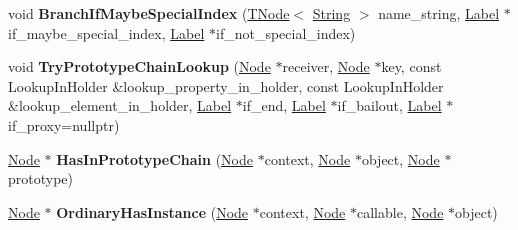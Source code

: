 \begin{DoxyCompactItemize}
\item 
\mbox{\label{classv8_1_1internal_1_1CodeStubAssembler_a328bb177a9eca968f3b887dee232cfe5}} 
void {\bfseries Branch\+If\+Maybe\+Special\+Index} (\mbox{\hyperlink{classv8_1_1internal_1_1compiler_1_1TNode}{T\+Node}}$<$ \mbox{\hyperlink{classv8_1_1internal_1_1String}{String}} $>$ name\+\_\+string, \mbox{\hyperlink{classv8_1_1internal_1_1compiler_1_1CodeAssemblerLabel}{Label}} $\ast$if\+\_\+maybe\+\_\+special\+\_\+index, \mbox{\hyperlink{classv8_1_1internal_1_1compiler_1_1CodeAssemblerLabel}{Label}} $\ast$if\+\_\+not\+\_\+special\+\_\+index)
\item 
\mbox{\label{classv8_1_1internal_1_1CodeStubAssembler_a7bb000cc0f43e802a9ef4f8100a98ce9}} 
void {\bfseries Try\+Prototype\+Chain\+Lookup} (\mbox{\hyperlink{classv8_1_1internal_1_1compiler_1_1Node}{Node}} $\ast$receiver, \mbox{\hyperlink{classv8_1_1internal_1_1compiler_1_1Node}{Node}} $\ast$key, const Lookup\+In\+Holder \&lookup\+\_\+property\+\_\+in\+\_\+holder, const Lookup\+In\+Holder \&lookup\+\_\+element\+\_\+in\+\_\+holder, \mbox{\hyperlink{classv8_1_1internal_1_1compiler_1_1CodeAssemblerLabel}{Label}} $\ast$if\+\_\+end, \mbox{\hyperlink{classv8_1_1internal_1_1compiler_1_1CodeAssemblerLabel}{Label}} $\ast$if\+\_\+bailout, \mbox{\hyperlink{classv8_1_1internal_1_1compiler_1_1CodeAssemblerLabel}{Label}} $\ast$if\+\_\+proxy=nullptr)
\item 
\mbox{\label{classv8_1_1internal_1_1CodeStubAssembler_a65e9a5ba14621ec8f6ea099d0ea497f4}} 
\mbox{\hyperlink{classv8_1_1internal_1_1compiler_1_1Node}{Node}} $\ast$ {\bfseries Has\+In\+Prototype\+Chain} (\mbox{\hyperlink{classv8_1_1internal_1_1compiler_1_1Node}{Node}} $\ast$context, \mbox{\hyperlink{classv8_1_1internal_1_1compiler_1_1Node}{Node}} $\ast$object, \mbox{\hyperlink{classv8_1_1internal_1_1compiler_1_1Node}{Node}} $\ast$prototype)
\item 
\mbox{\label{classv8_1_1internal_1_1CodeStubAssembler_aafeff9b617e108048b1d9a267388be00}} 
\mbox{\hyperlink{classv8_1_1internal_1_1compiler_1_1Node}{Node}} $\ast$ {\bfseries Ordinary\+Has\+Instance} (\mbox{\hyperlink{classv8_1_1internal_1_1compiler_1_1Node}{Node}} $\ast$context, \mbox{\hyperlink{classv8_1_1internal_1_1compiler_1_1Node}{Node}} $\ast$callable, \mbox{\hyperlink{classv8_1_1internal_1_1compiler_1_1Node}{Node}} $\ast$object)

\end{DoxyCompactItemize}
